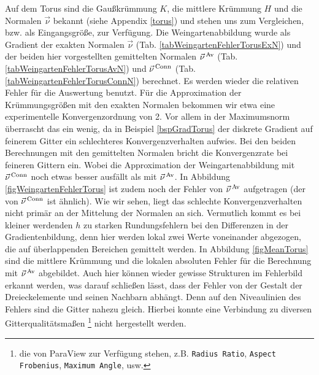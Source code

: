     \begin{beispiel}[Torus]
    \label{bspWeinTorus}
      Auf dem Torus sind die Gaußkrümmung \( K \), die mittlere Krüm\-mung \( H \) und die Normalen \( \vec{\nu} \) bekannt (siehe Appendix
      \ref{torus}) und stehen uns zum Vergleichen, bzw. als Eingangsgröße, zur Verfügung.
      Die Weingartenabbildung wurde als Gradient der exakten Normalen \( \vec{\nu} \) (Tab. \ref{tabWeingartenFehlerTorusExN})
      und der beiden hier vorgestellten gemittelten Normalen 
      \( \vec{\nu}^{\,\text{Av}} \) (Tab. \ref{tabWeingartenFehlerTorusAvN}) und 
      \( \vec{\nu}^{\,\text{Conn}} \) (Tab. \ref{tabWeingartenFehlerTorusConnN}) berechnet.
      Es werden wieder die relativen Fehler für die Auswertung benutzt.
      Für die Approximation der Krümmungsgrößen mit den exakten Normalen bekommen wir etwa eine experimentelle Konvergenzordnung von 2.
      Vor allem in der Maximumsnorm überrascht das ein wenig, da in Beispiel \ref{bspGradTorus} der diskrete Gradient auf feinerem Gitter ein
      schlechteres Konvergenzverhalten aufwies.
      Bei den beiden Berechnungen mit den gemittelten Normalen bricht die Konvergenzrate bei feineren Gittern ein. 
      Wobei die Approximation der Weingartenabbildung mit \( \vec{\nu}^{\,\text{Conn}} \) noch etwas besser ausfällt als mit \(
      \vec{\nu}^{\,\text{Av}} \).
      In Abbildung \ref{figWeingartenFehlerTorus} ist zudem noch der Fehler von \( \vec{\nu}^{\,\text{Av}} \) aufgetragen 
      (der von \( \vec{\nu}^{\,\text{Conn}} \) ist ähnlich).
      Wie wir sehen, liegt das schlechte Konvergenzverhalten nicht primär an der Mittelung der Normalen an sich.
      Vermutlich kommt es bei kleiner werdenden \( h \) zu starken Rundungsfehlern bei den Differenzen in der 
      Gradientenbildung, denn
      hier werden lokal zwei Werte voneinander abgezogen, die auf überlappenden Bereichen gemittelt werden. 
      In Abbildung \ref{figMeanTorus} sind die mittlere Krümmung und die lokalen absoluten Fehler für die Berechnung mit \(
      \vec{\nu}^{\,\text{Av}} \) abgebildet.
      Auch hier können wieder gewisse Strukturen im Fehlerbild erkannt werden, was darauf schließen lässt, dass der Fehler von der Gestalt
      der Dreieckelemente und seinen Nachbarn abhängt. 
      Denn auf den Niveaulinien des Fehlers sind die Gitter nahezu gleich.
      Hierbei konnte eine Verbindung zu diversen Gitterqualitätsmaßen
      \footnote{die von ParaView zur Verfügung stehen, z.B. \texttt{Radius Ratio}, \texttt{Aspect Frobenius}, \texttt{Maximum Angle}, usw.}
      nicht hergestellt werden.
      \begin{table}[htbp]

\end{table}
\end{beispiel}
